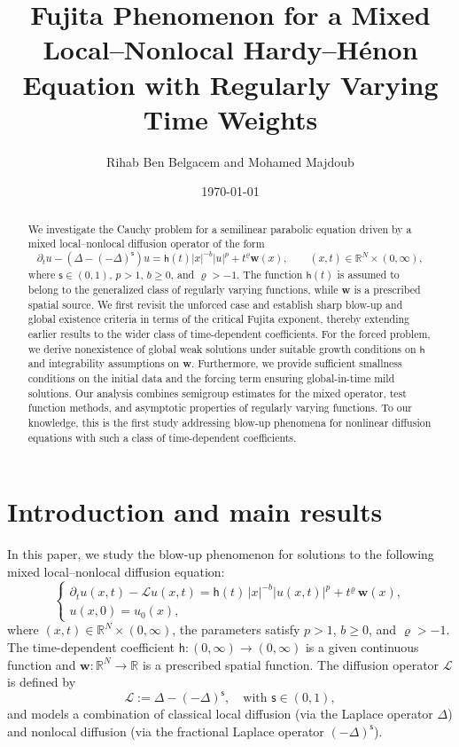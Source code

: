 \documentclass[12pt,reqno]{amsart}
\title[Mixed local/nonlocal]{Fujita Phenomenon for a Mixed Local--Nonlocal Hardy--H\'enon Equation with Regularly Varying Time Weights}
\author[R. Ben Belgacem and M. Majdoub]{Rihab Ben Belgacem and Mohamed Majdoub}
\theoremstyle{plain}
\theoremstyle{definition}
\theoremstyle{remark}
\numberwithin{equation}{section}
\newcommand{\sL}{\mathscr{L}}
\newcommand{\h}{\mathsf h}
\newcommand{\bw}{\mathbf{w}}
\newcommand{\ts}{\mathsf{s}}
\begin{document}
\allowdisplaybreaks

\begin{abstract}
We investigate the Cauchy problem for a semilinear parabolic equation driven by a mixed local--nonlocal diffusion operator of the form
\[
\partial_t u - (\Delta - (-\Delta)^\ts)u = \h(t)|x|^{-b}|u|^p + t^\varrho \bw(x), 
\qquad (x,t)\in \mathbb{R}^N\times (0,\infty),
\]
where $\ts\in (0,1)$, $p>1$, $b\geq 0$, and $\varrho>-1$. The function $\h(t)$ is assumed to belong to the generalized class of regularly varying functions, while $\bw$ is a prescribed spatial source. We first revisit the unforced case and establish sharp blow-up and global existence criteria in terms of the critical Fujita exponent, thereby extending earlier results to the wider class of time-dependent coefficients. For the forced problem, we derive nonexistence of global weak solutions under suitable growth conditions on $\h$ and integrability assumptions on $\bw$. Furthermore, we provide sufficient smallness conditions on the initial data and the forcing term ensuring global-in-time mild solutions. Our analysis combines semigroup estimates for the mixed operator, test function methods, and asymptotic properties of regularly varying functions. To our knowledge, this is the first study addressing blow-up phenomena for nonlinear diffusion equations with such a class of time-dependent coefficients.
\end{abstract}

\date{\today}
\maketitle


\section{Introduction and main results}
\label{S1}
In this paper, we study the blow-up phenomenon for solutions to the following mixed local--nonlocal diffusion equation:
\begin{equation} 
\begin{cases}
\partial_t u(x,t) - \sL u(x,t) = \h(t)\,|x|^{-b} |u(x,t)|^p + t^{\varrho}\,\bw(x), \\
u(x,0) = u_0(x), 
\end{cases}
\label{main}
\end{equation}
where $(x,t) \in \mathbb{R}^N \times (0, \infty)$, the parameters satisfy $p>1$, $b \geq 0$, and $\varrho > -1$. The time-dependent coefficient $\h \colon (0, \infty) \to (0, \infty)$ is a given continuous function and $\bw \colon \mathbb{R}^N \to \mathbb{R}$ is a prescribed spatial function. The diffusion operator $\sL$ is defined by
$$
\sL := \Delta - (-\Delta)^{\ts}, \quad \text{with } \ts \in (0,1),
$$
and models a combination of classical local diffusion (via the Laplace operator $\Delta$) and nonlocal diffusion (via the fractional Laplace operator $(-\Delta)^\ts$).
\end{document}
